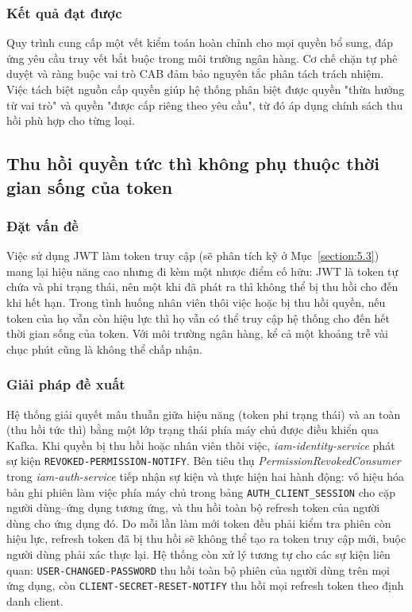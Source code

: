 \documentclass[../DoAn.tex]{subfiles}
\begin{document}
\subsubsection*{Kết quả đạt được}

Quy trình cung cấp một vết kiểm toán hoàn chỉnh cho mọi quyền bổ sung, đáp ứng yêu cầu truy vết bắt buộc trong môi trường ngân hàng. Cơ chế chặn tự phê duyệt và ràng buộc vai trò CAB đảm bảo nguyên tắc phân tách trách nhiệm. Việc tách biệt nguồn cấp quyền giúp hệ thống phân biệt được quyền "thừa hưởng từ vai trò" và quyền "được cấp riêng theo yêu cầu", từ đó áp dụng chính sách thu hồi phù hợp cho từng loại.

\subsection{Thu hồi quyền tức thì không phụ thuộc thời gian sống của token}
\label{subsection:5.2.3}

\subsubsection*{Đặt vấn đề}

Việc sử dụng JWT làm token truy cập (sẽ phân tích kỹ ở Mục~\ref{section:5.3}) mang lại hiệu năng cao nhưng đi kèm một nhược điểm cố hữu: JWT là token tự chứa và phi trạng thái, nên một khi đã phát ra thì không thể bị thu hồi cho đến khi hết hạn. Trong tình huống nhân viên thôi việc hoặc bị thu hồi quyền, nếu token của họ vẫn còn hiệu lực thì họ vẫn có thể truy cập hệ thống cho đến hết thời gian sống của token. Với môi trường ngân hàng, kể cả một khoảng trễ vài chục phút cũng là không thể chấp nhận.

\subsubsection*{Giải pháp đề xuất}

Hệ thống giải quyết mâu thuẫn giữa hiệu năng (token phi trạng thái) và an toàn (thu hồi tức thì) bằng một lớp trạng thái phía máy chủ được điều khiển qua Kafka. Khi quyền bị thu hồi hoặc nhân viên thôi việc, \textit{iam-identity-service} phát sự kiện \texttt{REVOKED-PERMISSION-NOTIFY}. Bên tiêu thụ \textit{PermissionRevokedConsumer} trong \textit{iam-auth-service} tiếp nhận sự kiện và thực hiện hai hành động: vô hiệu hóa bản ghi phiên làm việc phía máy chủ trong bảng \texttt{AUTH\_CLIENT\_SESSION} cho cặp người dùng--ứng dụng tương ứng, và thu hồi toàn bộ refresh token của người dùng cho ứng dụng đó. Do mỗi lần làm mới token đều phải kiểm tra phiên còn hiệu lực, refresh token đã bị thu hồi sẽ không thể tạo ra token truy cập mới, buộc người dùng phải xác thực lại. Hệ thống còn xử lý tương tự cho các sự kiện liên quan: \texttt{USER-CHANGED-PASSWORD} thu hồi toàn bộ phiên của người dùng trên mọi ứng dụng, còn \texttt{CLIENT-SECRET-RESET-NOTIFY} thu hồi mọi refresh token theo định danh client.
\end{document}
